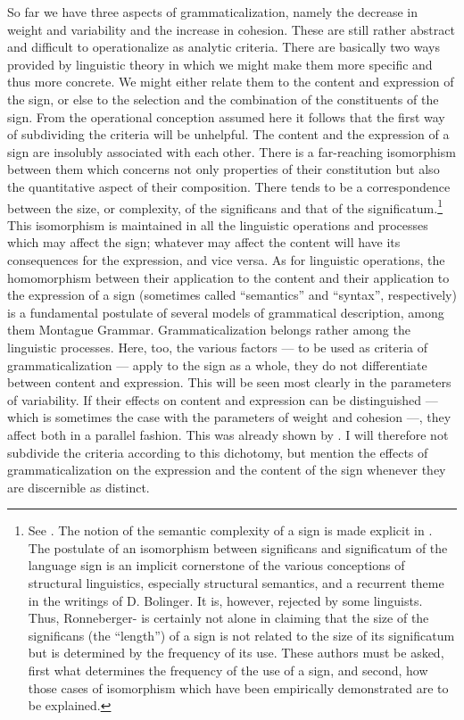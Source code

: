 So far we have three aspects of grammaticalization, namely the decrease in weight and variability and the increase in cohesion. These are still rather abstract and difficult to operationalize as analytic criteria. There are basically two ways provided by linguistic theory in which we might make them more specific and thus more concrete. We might either relate them to the content and expression of the sign, or else to the selection and the combination of the constituents of the sign. From the operational conception assumed here it follows that the first way of subdividing the criteria will be unhelpful. The content and the expression of a sign are insolubly associated with each other. There is a far-reaching isomorphism between them which concerns not only properties of their constitution but also the quantitative aspect of their composition. There tends to be a correspondence between the size, or complexity, of the significans and that of the significatum.\footnote{See \citet{Lehmann1974}. The notion of the semantic complexity of a sign is made explicit in \citet{Lehmann1978}. The postulate of an isomorphism between significans and significatum of the language sign is an implicit cornerstone of the various conceptions of structural linguistics, especially structural semantics, and a recurrent theme in the writings of D. Bolinger. It is, however, rejected by some linguists. Thus, Ronneberger-\citet[239]{Sibold1980} is certainly not alone in claiming that the size of the significans (the “length”) of a sign is not related to the size of its significatum but is determined by the frequency of its use. These authors must be asked, first what determines the frequency of the use of a sign, and second, how those cases of isomorphism which have been empirically demonstrated are to be explained.} This isomorphism is maintained in all the linguistic operations and processes which may affect the sign; whatever may affect the content will have its consequences for the expression, and vice versa. As for linguistic operations, the homomorphism between their application to the content and their application to the expression of a sign (sometimes called “semantics” and “syntax”, respectively) is a fundamental postulate of several models of grammatical description, among them Montague Grammar. Grammaticalization belongs rather among the linguistic processes. Here, too, the various factors — to be used as criteria of grammaticalization — apply to the sign as a whole, they do not differentiate between content and expression. This will be seen most clearly in the parameters of variability. If their effects on content and expression can be distinguished — which is sometimes the case with the parameters of weight and cohesion —, they affect both in a parallel fashion. This was already shown by \citet[135-139]{Meillet1912}. I will therefore not subdivide the criteria according to this dichotomy, but mention the effects of grammaticalization on the expression and the content of the sign whenever they are discernible as distinct.


